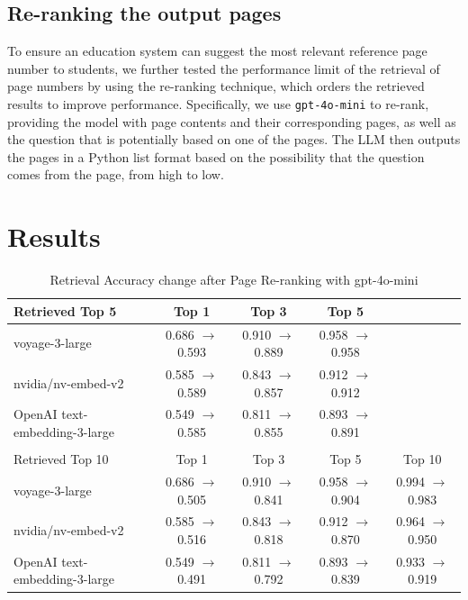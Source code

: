 \documentclass[runningheads]{llncs}
\begin{document}
\subsection{Re-ranking the output pages}
To ensure an education system can suggest the most relevant reference page number to students, we further tested the performance limit of the retrieval of page numbers by using the re-ranking technique, which orders the retrieved results to improve performance. Specifically, we use \texttt{gpt-4o-mini} to re-rank, providing the model with page contents and their corresponding pages, as well as the question that is potentially based on one of the pages. The LLM then outputs the pages in a Python list format based on the possibility that the question comes from the page, from high to low.



\section{Results}\label{sec4}

\begin{table}[b]
    \caption{Retrieval Accuracy change after Page Re-ranking with gpt-4o-mini}
    \centering
    \begin{tabular}{lcccc}
        \hline
        Retrieved Top 5 & Top 1 & Top 3 & Top 5\\
        \hline
        voyage-3-large & 0.686 $\rightarrow$ 0.593 & 0.910 $\rightarrow$ 0.889 & 0.958 $\rightarrow$ 0.958 \\ 
        nvidia/nv-embed-v2 &0.585 $\rightarrow$  0.589&0.843 $\rightarrow$ 0.857 &0.912 $\rightarrow$ 0.912 \\
        OpenAI text-embedding-3-large &0.549 $\rightarrow$  0.585 &0.811 $\rightarrow$ 0.855 &0.893 $\rightarrow$  0.891 \\
        \hline
        \\
        \hline
        Retrieved Top 10 & Top 1 & Top 3 & Top 5 & Top 10\\
        \hline
        voyage-3-large & 0.686 $\rightarrow$ 0.505 & 0.910 $\rightarrow$ 0.841 & 0.958 $\rightarrow$ 0.904 & 0.994 $\rightarrow$ 0.983 \\ 
        nvidia/nv-embed-v2 & 0.585 $\rightarrow$ 0.516 & 0.843 $\rightarrow$ 0.818 & 0.912 $\rightarrow$ 0.870 & 0.964 $\rightarrow$ 0.950 \\
        OpenAI text-embedding-3-large &0.549 $\rightarrow$ 0.491 &0.811 $\rightarrow$ 0.792 &0.893 $\rightarrow$ 0.839 &0.933 $\rightarrow$ 0.919 \\
        \hline
    \end{tabular}
    \label{tab:rerank}
\end{table}
\end{document}
